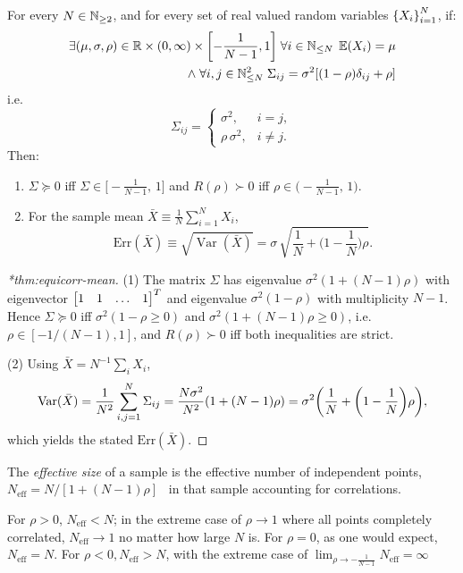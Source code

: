 \begin{theorem}
\label{thm:equicorr-mean}
For every $N\in\mathbb{N}_{\ge2}$, and for every set of real valued random variables $\qty{X_i}_{i=1}^N$, if:
\[
\begin{split}
\exists(\mu,\sigma,\rho)\in\mathbb{R}\times(0,\infty)\times\qty[-\frac1{N-1},1]\;\forall i\in \mathbb{N}_{\le N}\;\operatorname{\mathbb{E}}(X_i) = \mu \\\land\; \forall i, j\in \mathbb{N}_{\le N}^2\;\Sigma_{ij} = \sigma^2\qty[(1 - \rho)\delta_{ij} + \rho]
\end{split}
\]
i.e.
\[
\Sigma_{ij}=
\begin{cases}
\sigma^2,& i=j,\\[2pt]
\rho\,\sigma^2,& i\ne j.
\end{cases}
\]
Then:
\begin{enumerate}
\item $\Sigma\succeq 0$ iff $\Sigma\in\big[-\tfrac{1}{N-1},\,1\big]$ and $R(\rho)\succ 0$ iff $\rho\in\big(-\tfrac{1}{N-1},\,1\big)$.
\item For the sample mean $\bar X \equiv \frac{1}{N}\sum_{i=1}^N X_i$,
\begin{equation}\label{eq:equicorr-variance}
\mathrm{Err}(\bar X)\equiv\sqrt{\operatorname{Var}(\bar X)}=\sigma\,\sqrt{\frac{1}{N}+\Big(1-\frac{1}{N}\Big)\rho}.
\end{equation}
\end{enumerate}
\end{theorem}

\begin{proof}[*thm:equicorr-mean]
(1) The matrix \(\Sigma\) has eigenvalue $\sigma^2(1+(N-1)\rho)$ with eigenvector $\mqty[1&1&\dots&1]^T$ and eigenvalue $\sigma^2(1-\rho)$ with multiplicity $N-1$.
%
Hence $\Sigma\succeq 0$ iff $\sigma^2(1-\rho\ge 0)$ and $\sigma^2(1+(N-1)\rho\ge 0)$, i.e. $\rho\in[-1/(N-1),1]$, and $R(\rho)\succ 0$ iff both inequalities are strict.

(2) Using $\bar X= N^{-1}\sum_i X_i$,
\[
\operatorname{Var}(\bar X)
=\frac{1}{N^2}\sum_{i,j=1}^N \Sigma_{ij}
    =\frac{N\sigma^2}{N^2}\qty(1+(N-1)\rho)
=\sigma^2\qty(\frac{1}{N}+\qty(1-\frac{1}{N})\rho),
\]
which yields the stated $\mathrm{Err}(\bar X)$.
\end{proof}

    
    \begin{definition}
    The \emph{effective size} of a sample is the effective number of independent points, $N_{\text{eff}} = N/[1+(N-1)\rho]$~\cite{thompson_power_2021, wang_power_2022, baumann_tutorial_2025, Yang2011EffectiveAnalyses} in that sample accounting for correlations.
    \end{definition}
    For $\rho>0$, $N_{\text{eff}}<N$; in the extreme case of $\rho\to 1$ where all points completely correlated, $N_{\text{eff}}\to 1$ no matter how large $N$ is.
    For \(\rho = 0\), as one would expect, \(N_{\text{eff}} = N.\)
    For \(\rho < 0, N_{\text{eff}} > N\), with the extreme case of \(\lim_{\rho\to-\frac1{N-1}}N_{\text{eff}} = \infty\)
    
